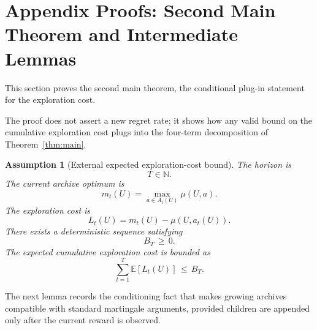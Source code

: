 \documentclass{article} %
\newtheorem{assumption}{Assumption}
\begin{document}
\section{Appendix Proofs: Second Main Theorem and Intermediate Lemmas}

\label{app:proofs2}

This section proves the second main theorem, the conditional plug-in statement for the exploration cost.

The proof does not assert a new regret rate; it shows how any valid bound on the cumulative exploration cost plugs into the four-term decomposition of Theorem~\ref{thm:main}.

\begin{assumption}[External expected exploration-cost bound]
\label{ass:app-external-tax}
The horizon is
\begin{equation}
\label{eq:app-tax-horizon}
T\in \mathbb{N}.
\end{equation}
The current archive optimum is
\begin{equation}
\label{eq:app-tax-current-optimum}
m_t(U)
=
\max_{a\in A_t(U)}\mu(U,a).
\end{equation}
The exploration cost is
\begin{equation}
\label{eq:app-tax-definition}
L_t(U)
=
m_t(U)-\mu(U,a_t(U)).
\end{equation}
There exists a deterministic sequence satisfying
\begin{equation}
\label{eq:app-external-tax-bound}
B_T\,\ge\, 0.
\end{equation}
The expected cumulative exploration cost is bounded as
\begin{equation}
\label{eq:app-external-tax-assumption}
\sum_{t=1}^{T}\mathbb{E}[L_t(U)]
\,\le\,
B_T.
\end{equation}
\end{assumption}

The next lemma records the conditioning fact that makes growing archives compatible with standard martingale arguments, provided children are appended only after the current reward is observed.
\end{document}
